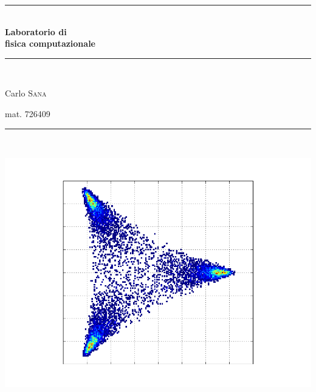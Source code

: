 \newcommand{\HRule}{\rule{\linewidth}{0.5mm}}
\begin{titlepage}
 \begin{center}
  \HRule \\[0.4cm]
{ \huge \bfseries Laboratorio di \\
fisica computazionale}\\[0.4cm]
\HRule \\[1cm]
\begin{flushleft} \Large
Carlo \textsc{Sana} 
\end{flushleft}

\begin{flushright} \Large
	mat. 726409
\end{flushright}
\HRule \\[1cm]

\end{center}

\begin{center}
\centering
	\includegraphics[scale=0.8]{cover.png}
\end{center}
\end{titlepage}
